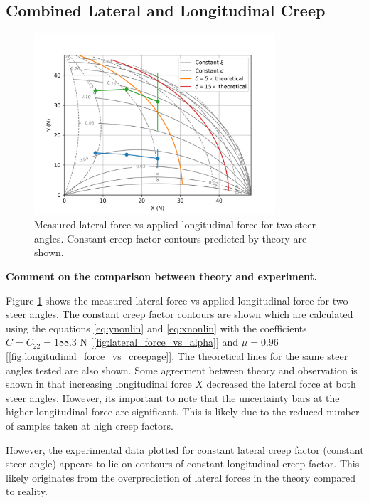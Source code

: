 \documentclass{article}
\begin{document}
\subsection{\textbf{Combined Lateral and Longitudinal Creep}}

\begin{figure}[H]
    \centering
    \includegraphics[width=0.8\textwidth]{5.3/XvsY.png}
    \caption{Measured lateral force vs applied longitudinal force for two steer angles. Constant creep factor contours predicted by theory are shown.}
    \label{fig:lateral_force_vs_longitudinal_force}
\end{figure}

\begin{center}
    \textbf{Comment on the comparison between theory and experiment.}
\end{center}

Figure \ref{fig:lateral_force_vs_longitudinal_force} shows the measured lateral force vs applied longitudinal force for two steer angles.
The constant creep factor contours are shown which are calculated using the equations \ref{eq:ynonlin} and \ref{eq:xnonlin} with the coefficients
$C = C_{22} = 188.3$ N [\ref{fig:lateral_force_vs_alpha}] and $\mu = 0.96$ [\ref{fig:longitudinal_force_vs_creepage}].
The theoretical lines for the same steer angles tested are also shown.
Some agreement between theory and observation is shown in that increasing longitudinal force $X$ decreased the lateral force at both steer angles.
However, its important to note that the uncertainty bars at the higher longitudinal force are significant.
This is likely due to the reduced number of samples taken at high creep factors.

However, the experimental data plotted for constant lateral creep factor (constant steer angle) appears to lie on contours of constant longitudinal creep factor.
This likely originates from the overprediction of lateral forces in the theory compared to reality.
\end{document}
